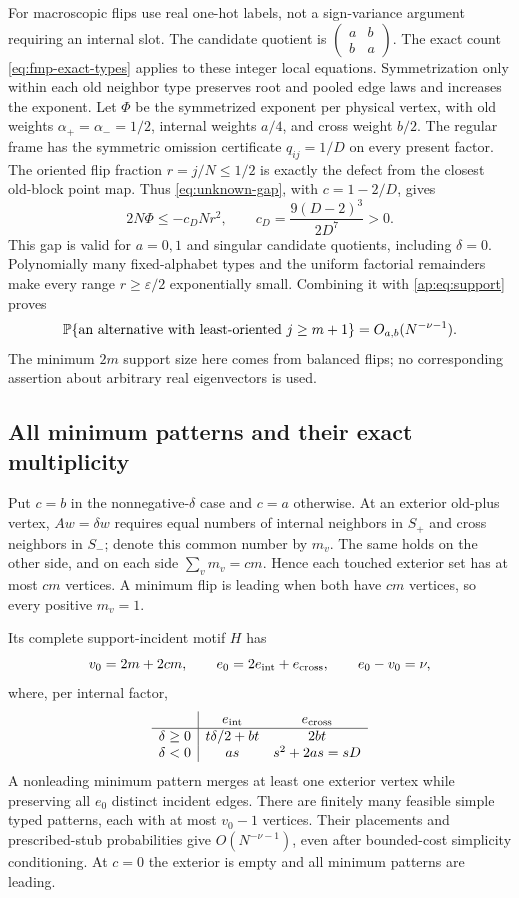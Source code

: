 For macroscopic flips use real one-hot labels, not a sign-variance
argument requiring an internal slot. The candidate quotient is
$\left(\begin{smallmatrix}a&b\\b&a\end{smallmatrix}\right)$.
The exact count \eqref{eq:fmp-exact-types} applies to these integer
local equations. Symmetrization only within each old neighbor type
preserves root and pooled edge laws and increases the exponent.
Let $\Phi$ be the symmetrized exponent per physical vertex, with
old weights $\alpha_+=\alpha_-=1/2$, internal weights $a/4$, and
cross weight $b/2$. The regular frame has the symmetric omission
certificate $q_{ij}=1/D$ on every present factor. The oriented flip
fraction $r=j/N\le1/2$ is exactly the defect from the closest
old-block point map. Thus \eqref{eq:unknown-gap}, with
$c=1-2/D$, gives
\begin{equation}\label{ap:eq:macro-gap}
 2N\Phi\le-c_DNr^2,\qquad
 c_D=\frac{9(D-2)^3}{2D^7}>0.
\end{equation}
This gap is valid for $a=0,1$ and singular candidate quotients,
including $\delta=0$. Polynomially many fixed-alphabet types and
the uniform factorial remainders make every range $r\ge\varepsilon/2$
exponentially small. Combining it with \eqref{ap:eq:support} proves
\begin{equation}\label{ap:eq:large}
 \mathbb P\{\text{an alternative with least-oriented }j\ge m+1\}
                         =O_{a,b}(N^{-\nu-1}).
\end{equation}
The minimum $2m$ support size here comes from balanced flips; no
corresponding assertion about arbitrary real eigenvectors is used.

\subsection{All minimum patterns and their exact multiplicity}
Put $c=b$ in the nonnegative-$\delta$ case and $c=a$ otherwise.
At an exterior old-plus vertex, $Aw=\delta w$ requires equal
numbers of internal neighbors in $S_+$ and cross neighbors in $S_-$;
denote this common number by $m_v$. The same holds on the other
side, and on each side $\sum_v m_v=cm$. Hence each touched exterior
set has at most $cm$ vertices. A minimum flip is leading when both
have $cm$ vertices, so every positive $m_v=1$.

Its complete support-incident motif $H$ has
\[
 v_0=2m+2cm,\qquad e_0=2e_{\rm int}+e_{\rm cross},
 \qquad e_0-v_0=\nu,
\]
where, per internal factor,
\[
 \begin{array}{c|cc}
 &e_{\rm int}&e_{\rm cross}\\ \hline
 \delta\ge0&t\delta/2+bt&2bt\\
 \delta<0&as&s^2+2as=sD
 \end{array}
\]
A nonleading minimum pattern merges at least one exterior vertex
while preserving all $e_0$ distinct incident edges. There are finitely
many feasible simple typed patterns, each with at most $v_0-1$
vertices. Their placements and prescribed-stub probabilities give
$O(N^{-\nu-1})$, even after bounded-cost simplicity conditioning.
At $c=0$ the exterior is empty and all minimum patterns are leading.

